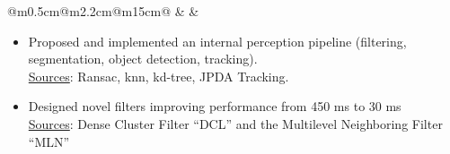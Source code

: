 \documentclass[10pt,a4paper]{article}
\begin{document}
\vspace{1em}                       
\begin{tabular}{@{}m{0.5cm}@{\hspace{0.5em}}m{2.2cm}@{\hspace{0.5em}}m{15cm}@{}}
   & 
  \raisebox{1.8em}{\begin{minipage}[t]{\linewidth}
  \centering
    \textcolor{blocktitle1_color}{Sep. 21}\\
    \textcolor{blocktitle1_color}{Sep. 22}
  \end{minipage} 
  } &
\end{tabular}


\vspace{-1em}
\begin{itemize}[leftmargin=*]
  \item Proposed and implemented an internal perception pipeline (filtering, segmentation, object detection, tracking).\\ {\fontsize{10pt}{10pt}\selectfont\textcolor{blocktext2_color}{{\fontsize{10pt}{10pt}\selectfont\textcolor{blocktext2_color}{\href{https://amr-aboughazala.super.site/projects/perception}{Sources}}}: Ransac, knn, kd-tree, JPDA Tracking}}. 
  \item Designed novel filters improving performance from 450 ms to 30 ms 
  \\ {\fontsize{10pt}{10pt}\selectfont\textcolor{blocktext2_color}{{\fontsize{10pt}{10pt}\selectfont\textcolor{blocktext2_color}{\href{https://amr-aboughazala.super.site/real-time-filtering}{Sources}}}: Dense Cluster Filter “DCL” and the Multilevel Neighboring Filter “MLN”}}

\end{itemize}
\end{document}
